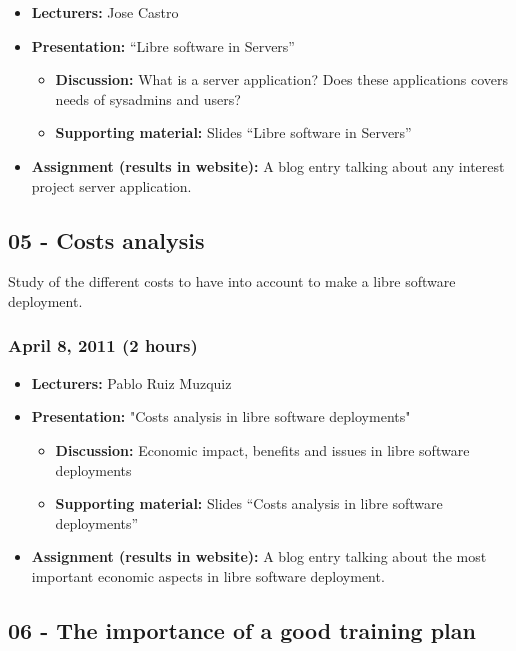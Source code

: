 \documentclass[a4paper]{article}
\begin{document}
\begin{itemize}
\item \textbf{Lecturers:} Jose Castro
\item \textbf{Presentation:} ``Libre software in Servers''
  \begin{itemize}
  \item \textbf{Discussion:} What is a server application? Does these applications covers needs of sysadmins and users?
  \item \textbf{Supporting material:} Slides ``Libre software in Servers''
  \end{itemize}
\item \textbf{Assignment (results in website):} A blog entry talking about any interest project server application.
\end{itemize}



\subsection{05 - Costs analysis }

Study of the different costs to have into account to make a libre software deployment. 

\subsubsection{April 8, 2011 (2 hours)}

\begin{itemize}
\item \textbf{Lecturers:} Pablo Ruiz Muzquiz 
\item \textbf{Presentation:} "Costs analysis in libre software deployments"
  \begin{itemize}
  \item \textbf{Discussion:} Economic impact, benefits and issues in libre software deployments
  \item \textbf{Supporting material:} Slides ``Costs analysis in libre software deployments''
  \end{itemize}
\item \textbf{Assignment (results in website):} A blog entry talking about the most important economic aspects in libre software deployment.
\end{itemize}


\subsection{06 - The importance of a good training plan }
\end{document}
